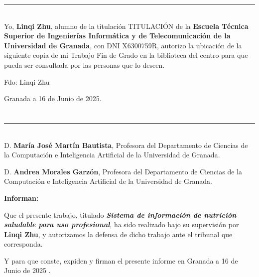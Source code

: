 \noindent\rule[-1ex]{\textwidth}{2pt}\\[4.5ex]

Yo, \textbf{Linqi Zhu}, alumno de la titulación TITULACIÓN de la \textbf{Escuela Técnica Superior
de Ingenierías Informática y de Telecomunicación de la Universidad de Granada}, con DNI X6300759R, autorizo la
ubicación de la siguiente copia de mi Trabajo Fin de Grado en la biblioteca del centro para que pueda ser
consultada por las personas que lo deseen.

\vspace{6cm}

\noindent Fdo: Linqi Zhu

\vspace{2cm}

\begin{flushright}
Granada a 16 de Junio de 2025.
\end{flushright}


\chapter*{}
\thispagestyle{empty}

\noindent\rule[-1ex]{\textwidth}{2pt}\\[4.5ex]

D. \textbf{María José Martín Bautista}, Profesora del Departamento de Ciencias de la Computación e Inteligencia Artificial de la Universidad de Granada.

\vspace{0.5cm}

D. \textbf{Andrea Morales Garzón}, Profesora del Departamento de Ciencias de la Computación e Inteligencia Artificial de la Universidad de Granada.


\vspace{0.5cm}

\textbf{Informan:}

\vspace{0.5cm}

Que el presente trabajo, titulado \textit{\textbf{Sistema de información de nutrición saludable para uso profesional}},
ha sido realizado bajo su supervisión por \textbf{Linqi Zhu}, y autorizamos la defensa de dicho trabajo ante el tribunal
que corresponda.

\vspace{0.5cm}

Y para que conste, expiden y firman el presente informe en Granada a 16 de Junio de 2025 .

\vspace{1cm}


